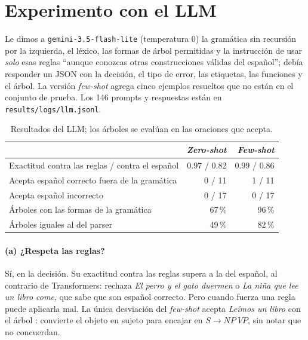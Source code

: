 \section{Experimento con el LLM}
\label{sec:analisis_llm}

Le dimos a \texttt{gemini-3.5-flash-lite} (temperatura 0) la gramática sin recursión por la
izquierda, el léxico, las formas de árbol permitidas y la instrucción de usar \emph{solo} esas
reglas ``aunque conozcas otras construcciones válidas del español''; debía responder un JSON
con la decisión, el tipo de error, las etiquetas, las funciones y el árbol. La versión
\emph{few-shot} agrega cinco ejemplos resueltos que no están en el conjunto de prueba. Los 146
prompts y respuestas están en \texttt{results/logs/llm.jsonl}.

\begin{table}[h]
  \centering
  \small
  \begin{tabular}{lrr}
    \toprule
    & \emph{Zero-shot} & \emph{Few-shot} \\
    \midrule
    Exactitud contra las reglas / contra el español & 0.97 / 0.82 & 0.99 / 0.86 \\
    Acepta español correcto fuera de la gramática & 0 / 11 & 1 / 11 \\
    Acepta español incorrecto & 0 / 17 & 0 / 17 \\
    Árboles con las formas de la gramática & 67\,\% & 96\,\% \\
    Árboles iguales al del parser & 49\,\% & 82\,\% \\
    \bottomrule
  \end{tabular}
  \caption{Resultados del LLM; los árboles se evalúan en las oraciones que acepta.}
  \label{tab:llm}
\end{table}

\paragraph{(a) ¿Respeta las reglas?} Sí, en la decisión. Su exactitud contra las reglas supera a
la del español, al contrario de Transformers: rechaza \emph{El perro y el gato duermen} o
\emph{La niña que lee un libro come}, que sabe que son español correcto. Pero cuando fuerza una
regla puede aplicarla mal. La única desviación del \emph{few-shot} acepta \emph{Leímos un
libro} con el árbol : convierte el objeto en sujeto para
encajar en $S \to NP\ VP$, sin notar que no concuerdan.

